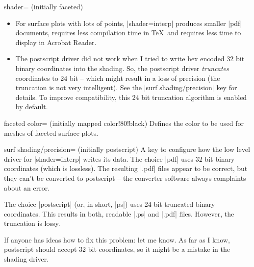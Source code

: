 \begin{pgfplotskey}{shader= (initially faceted)}
\begin{itemize}
		\item For surface plots with lots of points, |shader=interp| produces smaller |pdf| documents, requires less compilation time in \TeX\ and requires less time to display in Acrobat Reader.

		\item The postscript driver did not work when I tried to write hex encoded 32 bit binary coordinates into the shading. So, the postscript driver \emph{truncates} coordinates to 24 bit -- which might result in a loss of precision (the truncation is not very intelligent). See the |surf shading/precision| key for details. To improve compatibility, this 24 bit truncation algorithm is enabled by default.
	\end{itemize}

\pgfplotsexpensiveexample
\begin{codeexample}[]
\end{codeexample}

\pgfplotsexpensiveexample
\begin{codeexample}[]
\end{codeexample}
\end{pgfplotskey}

\begin{pgfplotskey}{faceted color= (initially mapped color!80!black)}
	Defines the color to be used for meshes of faceted surface plots.
\end{pgfplotskey}

\begin{pgfplotskey}{surf shading/precision= (initially postscript)}
	A key to configure how the low level driver for |shader=interp| writes its data. The choice |pdf| uses 32 bit binary coordinates (which is lossless). The resulting |.pdf| files appear to be correct, but they can't be converted to postscript -- the converter software always complaints about an error. 

	The choice |postscript| (or, in short, |ps|) uses 24 bit truncated binary coordinates. This results in both, readable |.ps| and |.pdf| files. However, the truncation is lossy.

	If anyone has ideas how to fix this problem: let me know. As far as I know, postscript should accept 32 bit coordinates, so it might be a mistake in the shading driver.
\end{pgfplotskey}

